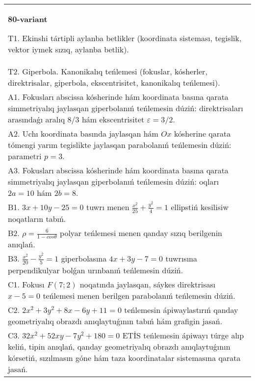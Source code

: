 \documentclass{article}
\begin{document}
\begin{tabular}{m{17cm}}
\textbf{80-variant}
\newline

T1. Ekinshi tártipli aylanba betlikler (koordinata sisteması, tegislik, vektor iymek sızıq, aylanba betlik).\\

T2. Giperbola. Kanonikalıq teńlemesi (fokuslar, kósherler, direktrisalar, giperbola, ekscentrisitet, kanonikalıq teńlemesi).\\

A1. Fokusları abscissa kósherinde hám koordinata basına qarata simmetriyalıq jaylasqan giperbolanıń teńlemesin dúziń: direktrisaları arasındaǵı aralıq $8/3$ hám ekscentrisitet $\varepsilon=3/2$.\\

A2. Uchı koordinata basında jaylasqan hám $Ox$ kósherine qarata tómengi yarım tegislikte jaylasqan parabolanıń teńlemesin dúziń: parametri $p=3$.\\

A3. Fokusları abscissa kósherinde hám koordinata basına qarata simmetriyalıq jaylasqan giperbolanıń teńlemesin dúziń: oqları $2 a=10$ hám $2 b=8$.\\

B1. $3x + 10y - 25 = 0$ tuwrı menen $\frac{x^{2}}{25} + \frac{y^{2}}{4} = 1$ ellipstiń kesilisiw noqatların tabıń.\\

B2. $\rho = \frac{6}{1 - cos\theta}$ polyar teńlemesi menen qanday sızıq berilgenin anıqlań.  \\

B3. $\frac{x^{2}}{20} - \frac{y^{2}}{5} = 1$ giperbolasına $4x + 3y - 7 = 0$ tuwrısına perpendikulyar bolǵan urınbanıń teńlemesin dúziń.  \\

C1. Fokusı $F(7;2)$ noqatında jaylasqan, sáykes direktrisası $x - 5 = 0$ teńlemesi menen berilgen parabolanıń teńlemesin dúziń.  \\

C2. $2x^{2} + 3y^{2} + 8x - 6y + 11 = 0$ teńlemesin ápiwaylastırıń qanday geometriyalıq obrazdı anıqlaytuǵının tabıń hám grafigin jasań.\\

C3. $32x^{2} + 52xy - 7y^{2} + 180 = 0$ ETİS teńlemesin ápiwayı túrge alıp keliń, tipin anıqlań, qanday geometriyalıq obrazdı anıqlaytuǵının kórsetiń, sızılmasın góne hám taza koordinatalar sistemasına qarata jasań.  \\

\end{tabular}
\vspace{1cm}
\end{document}
